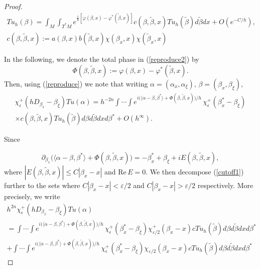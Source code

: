\documentclass[11pt,reqno]{amsart}
\newcommand{\ep}{\varepsilon}
\renewcommand{\Re} {\mathrm{Re\,}}
\theoremstyle{definition}
\begin{document}
\begin{proof}
\begin{align} \label{reproduce2}
Tu_h(\beta) = \int_M \int_{T^*M}e^{\frac{i}{h}[\varphi(\beta,x) -\varphi^*(\tilde{\beta}, x)]}c(\beta,\tilde{\beta},x) Tu_h(\tilde{\beta})d\tilde{\beta} dx  +O(e^{-C/h}), \nonumber \\
 c(\beta,\tilde{\beta},x):= a(\beta,x)b(\tilde{\beta},x) \chi(\beta_x,x) \chi(\tilde{\beta}_x,x) \hspace{1in}
\end{align}


In the following, we denote the total phase in (\ref{reproduce2}) by
\begin{equation}\label{Phi phase}
\Phi(\beta,\tilde{\beta},x):= \varphi(\beta,x)-\varphi^*(\tilde{\beta},x).
\end{equation}
Then, using (\ref{reproduce}) we note that writing $\alpha = (\alpha_x,\alpha_{\xi}), \, \beta = (\beta_x, \beta_{\xi}),$
\begin{align} \label{cutoff1}
\chi_{\epsilon}^+( hD_{\beta_x} - \beta_{\xi}) Tu(\alpha) =  h^{-2n} \int \cdots \int e^{i  \big( \langle \alpha - \beta, \beta^* \rangle  + \Phi(\beta,\tilde{\beta},x)  \big)/h } \, \chi_{\epsilon}^+ (\beta_x^*- \beta_{\xi})  \nonumber \\
\times c(\beta,\tilde{\beta},x) Tu_h(\tilde{\beta})d\beta d\tilde{\beta} dx d\beta^*+O(h^{\infty}).
\end{align}

Since

$$ \partial_{\beta_x} \big( \langle \alpha - \beta, \beta^* \rangle + \Phi(\beta,\tilde{\beta},x) \big)  = - \beta_x^* + \beta_{\xi} +  i E(\beta,\tilde{\beta},x),$$
where $|E(\beta,\tilde{\beta},x)| \leq C |\beta_x-x|$ and $\Re E = 0.$  We  then decompose (\ref{cutoff1}) further to  the sets where $C |\beta_x-x| < \ep/2$ and $ C |\beta_x-x| > \ep/2$ respectively. More precisely, we write
\begin{align} \label{cutoff2}
h^{2n}\chi_{\epsilon}^+( hD_{\beta_x} - \beta_{\xi}) Tu(\alpha) \hspace{4in} \nonumber \\
=\int \cdots \int e^{i  \big( \langle \alpha - \beta, \beta^* \rangle  + \Phi(\beta, \tilde{\beta},x)  \big)/h } \, \chi_{\epsilon}^+ (\beta_x^*- \beta_{\xi})  \chi_{\ep/2}^+ (\beta_x -x) c Tu_h(\tilde{\beta})d\beta d{\tilde{\beta}} dx  d\beta^* \nonumber \\
+   \int \cdots \int e^{i  \big( \langle \alpha - \beta, \beta^* \rangle  + \Phi(\beta,\tilde{\beta},x)  \big)/h } \, \chi_{\epsilon}^+ (\beta_x^*- \beta_{\xi})  \chi_{\ep/2}(\beta_x -x) c Tu_h(\tilde{\beta})d\beta d\tilde{\beta} dx d\beta^*
\end{align}


\end{proof}
\end{document}
